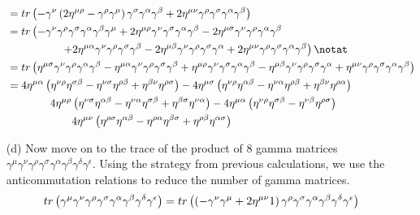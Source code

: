 \begin{enumerate}
\begin{align}
        &=tr\left(-\gamma^\nu\left(2\eta^{\mu\rho}-\gamma^\rho\gamma^\mu\right)\gamma^\sigma\gamma^\alpha\gamma^\beta+2\eta^{\mu\nu}\gamma^\rho\gamma^\sigma\gamma^\alpha\gamma^\beta\right)\notag\\
        &=tr\left(-\gamma^\nu\gamma^\rho\gamma^\sigma\gamma^\alpha\gamma^\beta\gamma^\mu+2\eta^{\mu\rho}\gamma^\nu\gamma^\sigma\gamma^\alpha\gamma^\beta-2\eta^{\mu\sigma}\gamma^\nu\gamma^\rho\gamma^\alpha\gamma^\beta\right.\notag\\
        &\left.\hspace{50pt}+2\eta^{\mu\alpha}\gamma^\nu\gamma^\rho\gamma^\sigma\gamma^\beta-2\eta^{\mu\beta}\gamma^\nu\gamma^\rho\gamma^\sigma\gamma^\alpha+2\eta^{\mu\nu}\gamma^\rho\gamma^\sigma\gamma^\alpha\gamma^\beta\right)\notat\\
        &=tr\left(\eta^{\mu\sigma}\gamma^\nu\gamma^\rho\gamma^\alpha\gamma^\beta-\eta^{\mu\alpha}\gamma^\nu\gamma^\rho\gamma^\sigma\gamma^\beta+\eta^{\mu\rho}\gamma^\nu\gamma^\sigma\gamma^\alpha\gamma^\beta-\eta^{\mu\beta}\gamma^\nu\gamma^\rho\gamma^\sigma\gamma^\alpha+\eta^{\mu\nu}\gamma^\rho\gamma^\sigma\gamma^\alpha\gamma^\beta\right)\notag\\
        &=4\eta^{\mu\alpha}\left(\eta^{\nu\rho}\eta^{\sigma\beta}-\eta^{\nu\sigma}\eta^{\rho\beta}+\eta^{\beta\nu}\eta^{\rho\sigma}\right)-4\eta^{\mu\sigma}\left(\eta^{\nu\rho}\eta^{\alpha\beta}-\eta^{\nu\alpha}\eta^{\rho\beta}+\eta^{\beta\nu}\eta^{\rho\alpha}\right)\notag\\
        &\hspace{40pt}4\eta^{\mu\rho}\left(\eta^{\nu\sigma}\eta^{\alpha\beta}-\eta^{\nu\alpha}\eta^{\sigma\beta}+\eta^{\beta\sigma}\eta^{\nu\alpha}\right)-4\eta^{\mu\alpha}\left(\eta^{\nu\rho}\eta^{\sigma\beta}-\eta^{\nu\beta}\eta^{\rho\sigma}\right)\notag\\
        &\hspace{60pt}4\eta^{\mu\nu}\left(\eta^{\rho\sigma}\eta^{\alpha\beta}-\eta^{\rho\alpha}\eta^{\beta\sigma}+\eta^{\rho\beta}\eta^{\alpha\sigma}\right)\label{eq:six-matrices}
    \end{align}
    \item [(d)] Now move on to the trace of the product of 8 gamma matrices $\gamma^\mu \gamma^\nu \gamma^\rho \gamma^\sigma \gamma^\alpha \gamma^\beta \gamma^\delta \gamma^\epsilon$. Using the strategy from previous calculations, we use the anticommutation relations to reduce the number of gamma matrices.
    \begin{align}
        tr\left(\gamma^\mu \gamma^\nu \gamma^\rho \gamma^\sigma \gamma^\alpha \gamma^\beta \gamma^\delta \gamma^\epsilon\right) &= tr\left(\left(-\gamma^\nu \gamma^\mu + 2 \eta^{\mu\nu}1\right) \gamma^\rho \gamma^\sigma \gamma^\alpha \gamma^\beta \gamma^\delta \gamma^\epsilon\right)\notag\\

\end{align}
\end{enumerate}

